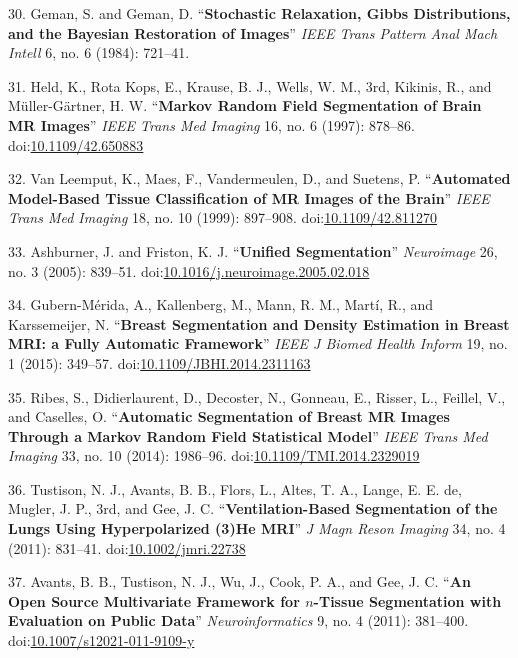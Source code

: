 \documentclass[11pt,]{article}
\begin{document}
30. Geman, S. and Geman, D. ``\textbf{Stochastic Relaxation, Gibbs
Distributions, and the Bayesian Restoration of Images}'' \emph{IEEE
Trans Pattern Anal Mach Intell} 6, no. 6 (1984): 721--41.

31. Held, K., Rota Kops, E., Krause, B. J., Wells, W. M., 3rd, Kikinis,
R., and M{ü}ller-G{ä}rtner, H. W. ``\textbf{Markov Random Field
Segmentation of Brain MR Images}'' \emph{IEEE Trans Med Imaging} 16, no.
6 (1997): 878--86.
doi:\href{http://dx.doi.org/10.1109/42.650883}{10.1109/42.650883}

32. Van Leemput, K., Maes, F., Vandermeulen, D., and Suetens, P.
``\textbf{Automated Model-Based Tissue Classification of MR Images of
the Brain}'' \emph{IEEE Trans Med Imaging} 18, no. 10 (1999): 897--908.
doi:\href{http://dx.doi.org/10.1109/42.811270}{10.1109/42.811270}

33. Ashburner, J. and Friston, K. J. ``\textbf{Unified Segmentation}''
\emph{Neuroimage} 26, no. 3 (2005): 839--51.
doi:\href{http://dx.doi.org/10.1016/j.neuroimage.2005.02.018}{10.1016/j.neuroimage.2005.02.018}

34. Gubern-M{é}rida, A., Kallenberg, M., Mann, R. M., Mart{í}, R., and
Karssemeijer, N. ``\textbf{Breast Segmentation and Density Estimation in
Breast MRI: a Fully Automatic Framework}'' \emph{IEEE J Biomed Health
Inform} 19, no. 1 (2015): 349--57.
doi:\href{http://dx.doi.org/10.1109/JBHI.2014.2311163}{10.1109/JBHI.2014.2311163}

35. Ribes, S., Didierlaurent, D., Decoster, N., Gonneau, E., Risser, L.,
Feillel, V., and Caselles, O. ``\textbf{Automatic Segmentation of Breast
MR Images Through a Markov Random Field Statistical Model}'' \emph{IEEE
Trans Med Imaging} 33, no. 10 (2014): 1986--96.
doi:\href{http://dx.doi.org/10.1109/TMI.2014.2329019}{10.1109/TMI.2014.2329019}

36. Tustison, N. J., Avants, B. B., Flors, L., Altes, T. A., Lange, E.
E. de, Mugler, J. P., 3rd, and Gee, J. C. ``\textbf{Ventilation-Based
Segmentation of the Lungs Using Hyperpolarized (3)He MRI}'' \emph{J Magn
Reson Imaging} 34, no. 4 (2011): 831--41.
doi:\href{http://dx.doi.org/10.1002/jmri.22738}{10.1002/jmri.22738}

37. Avants, B. B., Tustison, N. J., Wu, J., Cook, P. A., and Gee, J. C.
``\textbf{An Open Source Multivariate Framework for $n$-Tissue
Segmentation with Evaluation on Public Data}'' \emph{Neuroinformatics}
9, no. 4 (2011): 381--400.
doi:\href{http://dx.doi.org/10.1007/s12021-011-9109-y}{10.1007/s12021-011-9109-y}
\end{document}
